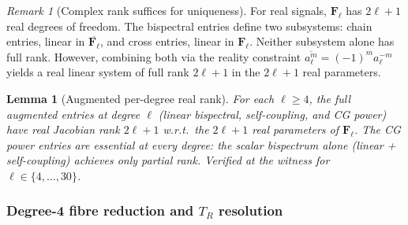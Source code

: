 \documentclass{article}
\newtheorem{lemma}[theorem]{Lemma}
\theoremstyle{definition}
\theoremstyle{remark}
\newtheorem{remark}[theorem]{Remark}
\newcommand{\conj}[1]{\overline{#1}}
\theoremstyle{definition}
\begin{document}
\begin{remark}[Complex rank suffices for uniqueness]\label{rem:app-complex-real}
For real signals, $\mathbf{F}_\ell$ has $2\ell+1$ real degrees of freedom.
The bispectral entries define two subsystems: chain entries, linear in
$\conj{\mathbf{F}_\ell}$, and cross entries, linear in $\mathbf{F}_\ell$.
Neither subsystem alone has full rank.
However, combining both via the reality constraint
$\conj{a_\ell^m} = (-1)^m a_\ell^{-m}$ yields a real linear system
of full rank $2\ell+1$ in the $2\ell+1$ real parameters.
\end{remark}

\begin{lemma}[Augmented per-degree real rank]\label{lem:app-augmented-perdegree}
For each $\ell \ge 4$, the full augmented entries at degree $\ell$
(linear bispectral, self-coupling, and CG power) have real Jacobian
rank $2\ell+1$ w.r.t.\ the $2\ell+1$ real parameters of $\mathbf{F}_\ell$.
The CG power entries are essential at every degree: the scalar
bispectrum alone (linear + self-coupling) achieves only partial rank.
Verified at the witness for $\ell \in \{4, \ldots, 30\}$.
\end{lemma}

\subsubsection{Degree-4 fibre reduction and $T_R$ resolution}
\end{document}
